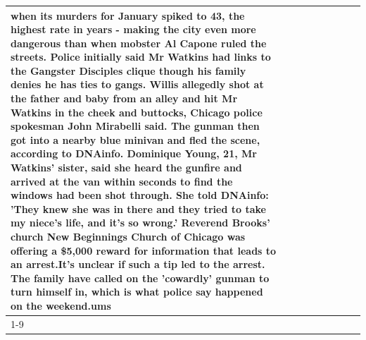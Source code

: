 \begin{table}[H]
\begin{tabular}{lllrlllll}
when its murders for January spiked to 43, the highest rate in years - making the city even more dangerous than when mobster Al Capone ruled the streets. Police initially said Mr Watkins had links to the Gangster Disciples clique though his family denies he has ties to gangs. Willis allegedly shot at the father and baby from an alley and hit Mr Watkins in the cheek and buttocks, Chicago police spokesman John Mirabelli said. The gunman then got into a nearby blue minivan and fled the scene, according to DNAinfo. Dominique Young, 21, Mr Watkins' sister, said she heard the gunfire and arrived at the van within seconds to find the windows had been shot through. She told DNAinfo: 'They knew she was in there and they tried to take my niece's life, and it's so wrong.' Reverend Brooks' church New Beginnings Church of Chicago was offering a \$5,000 reward for information that leads to an arrest.It's unclear if such a tip led to the arrest. The family have called on the 'cowardly' gunman to turn himself in, which is what police say happened on the weekend.ums \\
\cline{1-9}

\end{tabular}
\end{table}
